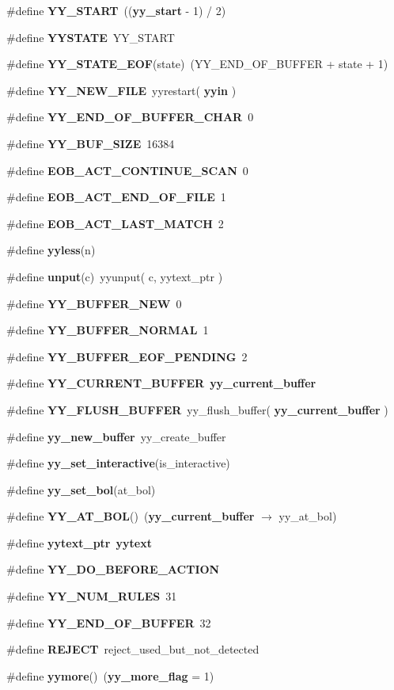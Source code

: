 \begin{CompactItemize}
\item 
\#define {\bf YY\_\-START}\ (({\bf yy\_\-start} - 1) / 2)
\item 
\#define {\bf YYSTATE}\ YY\_\-START
\item 
\#define {\bf YY\_\-STATE\_\-EOF}(state)\ (YY\_\-END\_\-OF\_\-BUFFER + state + 1)
\item 
\#define {\bf YY\_\-NEW\_\-FILE}\ yyrestart( {\bf yyin} )
\item 
\#define {\bf YY\_\-END\_\-OF\_\-BUFFER\_\-CHAR}\ 0
\item 
\#define {\bf YY\_\-BUF\_\-SIZE}\ 16384
\item 
\#define {\bf EOB\_\-ACT\_\-CONTINUE\_\-SCAN}\ 0
\item 
\#define {\bf EOB\_\-ACT\_\-END\_\-OF\_\-FILE}\ 1
\item 
\#define {\bf EOB\_\-ACT\_\-LAST\_\-MATCH}\ 2
\item 
\#define {\bf yyless}(n)
\item 
\#define {\bf unput}(c)\ yyunput( c, yytext\_\-ptr )
\item 
\#define {\bf YY\_\-BUFFER\_\-NEW}\ 0
\item 
\#define {\bf YY\_\-BUFFER\_\-NORMAL}\ 1
\item 
\#define {\bf YY\_\-BUFFER\_\-EOF\_\-PENDING}\ 2
\item 
\#define {\bf YY\_\-CURRENT\_\-BUFFER}\ {\bf yy\_\-current\_\-buffer}
\item 
\#define {\bf YY\_\-FLUSH\_\-BUFFER}\ yy\_\-flush\_\-buffer( {\bf yy\_\-current\_\-buffer} )
\item 
\#define {\bf yy\_\-new\_\-buffer}\ yy\_\-create\_\-buffer
\item 
\#define {\bf yy\_\-set\_\-interactive}(is\_\-interactive)
\item 
\#define {\bf yy\_\-set\_\-bol}(at\_\-bol)
\item 
\#define {\bf YY\_\-AT\_\-BOL}()\ ({\bf yy\_\-current\_\-buffer} $\rightarrow$ yy\_\-at\_\-bol)
\item 
\#define {\bf yytext\_\-ptr}\ {\bf yytext}
\item 
\#define {\bf YY\_\-DO\_\-BEFORE\_\-ACTION}
\item 
\#define {\bf YY\_\-NUM\_\-RULES}\ 31
\item 
\#define {\bf YY\_\-END\_\-OF\_\-BUFFER}\ 32
\item 
\#define {\bf REJECT}\ reject\_\-used\_\-but\_\-not\_\-detected
\item 
\#define {\bf yymore}()\ ({\bf yy\_\-more\_\-flag} = 1)

\end{CompactItemize}
